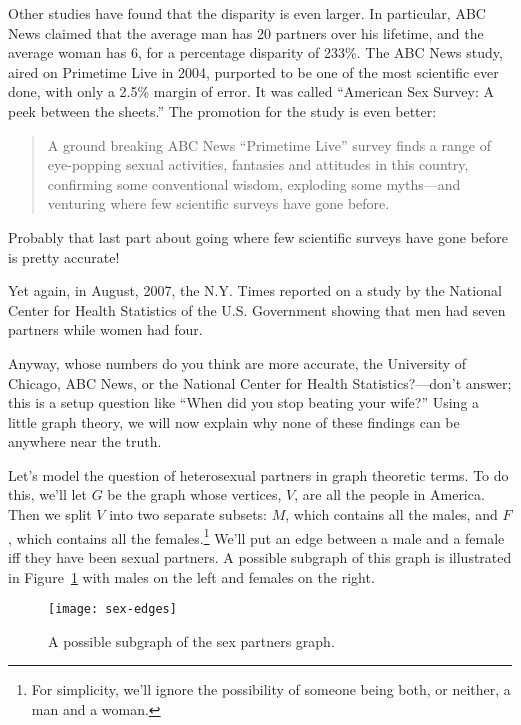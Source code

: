 Other studies have found that the disparity is even larger.  In
particular, ABC News claimed that the average man has 20 partners over his
lifetime, and the average woman has 6, for a percentage disparity of
233\%.  The ABC News study, aired on Primetime Live in 2004, purported to
be one of the most scientific ever done, with only a 2.5\% margin of
error.  It was called ``American Sex Survey: A peek between the sheets.''
The promotion for the study is even better:
\begin{quote}
A ground breaking ABC News ``Primetime Live'' survey finds a range of
eye-popping sexual activities, fantasies and attitudes in this country,
confirming some conventional wisdom, exploding some myths---and venturing
where few scientific surveys have gone before.
\end{quote}
Probably that last part about going where few scientific surveys have gone
before is pretty accurate!

Yet again, in August, 2007, the N.Y. Times reported
on a study by the National Center for Health Statistics of the
U.S. Government showing that men had seven partners while women had
four.

Anyway, whose numbers do you think are more accurate, the University
of Chicago, ABC News, or the National Center for Health
Statistics?---don't answer; this is a setup question like ``When did
you stop beating your wife?''  Using a little graph theory, we will
now explain why none of these findings can be anywhere near the truth.

Let's model the question of heterosexual partners in graph theoretic
terms.  To do this, we'll let $G$ be the graph whose vertices, $V$,
are all the people in America.  Then we split $V$ into two separate
subsets: $M$, which contains all the males, and $F$, which contains
all the females.\footnote{For simplicity, we'll ignore the possibility
  of someone being both, or neither, a man and a woman.}  We'll put an
edge between a male and a female iff they have been sexual partners.
A possible subgraph of this graph is illustrated in
Figure~\ref{fig:partners} with males on the left and females on the
right.

\begin{figure}[htbp]\redrawn

\texttt{[image: sex-edges]}

\caption{A possible subgraph of the sex partners graph.}
\label{fig:partners}
\end{figure}


